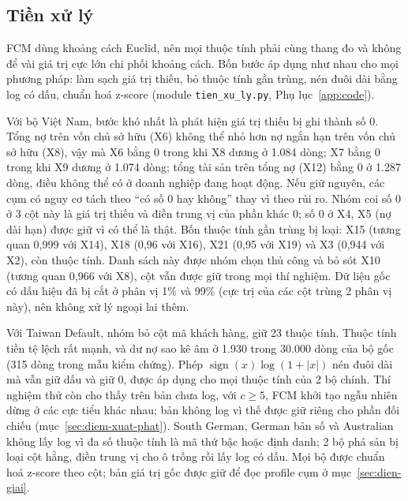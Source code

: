 

\subsection{Tiền xử lý}
\label{sec:tien-xu-ly}

FCM dùng khoảng cách Euclid, nên mọi thuộc tính phải cùng thang đo và không để vài giá trị cực lớn chi
phối khoảng cách. Bốn bước áp dụng như nhau cho mọi phương pháp: làm sạch giá trị thiếu, bỏ thuộc tính gần trùng, nén
đuôi dài bằng log có dấu, chuẩn hoá z-score (module \texttt{tien\_xu\_ly.py}, Phụ lục~\ref{app:code}).

Với bộ Việt Nam, bước khó nhất là phát hiện giá trị thiếu bị ghi thành số 0. Tổng nợ trên vốn chủ sở hữu (X6) không thể
nhỏ hơn nợ ngắn hạn trên vốn chủ sở hữu (X8), vậy mà X6 bằng 0 trong khi X8 dương ở 1.084 dòng; X7 bằng 0 trong khi X9
dương ở 1.074 dòng; tổng tài sản trên tổng nợ (X12) bằng 0 ở 1.287 dòng, điều không thể có ở doanh nghiệp đang hoạt
động. Nếu giữ nguyên, các cụm có nguy cơ tách theo ``có số 0 hay không'' thay vì theo rủi ro. Nhóm coi số 0 ở 3 cột
này là giá trị thiếu và điền trung vị của phần khác 0; số 0 ở X4, X5 (nợ dài hạn) được giữ vì có thể là thật. Bốn thuộc
tính gần trùng bị loại: X15 (tương quan 0,999 với X14), X18 (0,96 với X16), X21 (0,95 với X19) và X3 (0,944 với X2),
còn \soLieuMoTaVietNamD{} thuộc tính. Danh sách này được nhóm chọn thủ công và bỏ sót X10 (tương quan
0,966 với X8), cột vẫn được giữ trong mọi thí nghiệm. Dữ liệu gốc có dấu hiệu đã bị cắt ở phân vị 1\% và 99\% (cực trị của các cột trùng
2 phân vị này), nên không xử lý ngoại lai thêm.

Với Taiwan Default, nhóm bỏ cột mã khách hàng, giữ 23 thuộc tính. Thuộc tính tiền tệ lệch rất mạnh, và dư nợ sao kê âm
ở 1.930 trong 30.000 dòng của bộ gốc (315 dòng trong mẫu kiểm chứng). Phép $\operatorname{sign}(x)\log(1 + |x|)$ nén
đuôi dài mà vẫn giữ dấu và giữ 0, được áp dụng cho mọi thuộc tính của 2 bộ chính. Thí nghiệm thử còn cho thấy trên
bản chưa log, với $c \ge 5$, FCM khởi tạo ngẫu nhiên dừng ở các cực tiểu khác nhau; bản không log vì thế được giữ riêng
cho phần đối chiếu (mục~\ref{sec:diem-xuat-phat}). South German, German bản số và Australian không lấy log vì đa số thuộc
tính là mã thứ bậc hoặc định danh; 2 bộ phá sản bị loại cột hằng, điền trung vị cho ô trống rồi lấy log có dấu. Mọi
bộ được chuẩn hoá z-score theo cột; bản giá trị gốc được giữ để đọc profile cụm ở mục~\ref{sec:dien-giai}.

